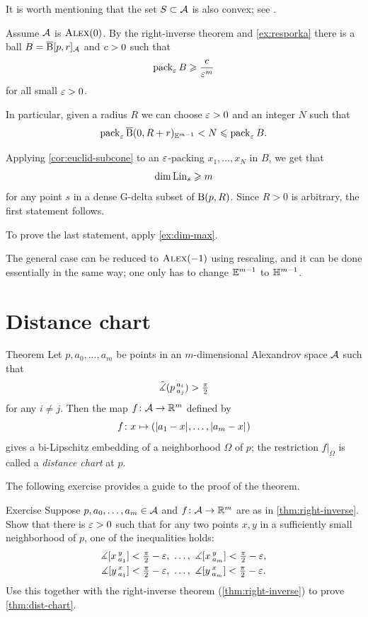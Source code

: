 It is worth mentioning that the set $S\subset\mathcal{A}$ is also convex; see \cite[1.10]{petrunin1998}.


Assume $\mathcal{A}$ is $\textup{\textsc{Alex}}(0)$.
By the right-inverse theorem and \ref{ex:resporka} there is a ball $B=\overline{\mathrm{B}}{}[p,r]_{\mathcal{A}}$ and $c>0$ such that
\[\operatorname{\rm pack}\nolimits_\varepsilon B\geqslant \frac{c}{\varepsilon^m}\]
for all small $\varepsilon>0$.

In particular, given a radius $R$ we can choose $\varepsilon>0$ and an integer $N$ such that
\[\operatorname{\rm pack}\nolimits_\varepsilon \overline{\mathrm{B}}{}(0,R+r)_{\mathbb{E}^{m-1}}< N\leqslant \operatorname{\rm pack}\nolimits_\varepsilon B.\]

Applying \ref{cor:euclid-subcone} to an $\varepsilon$-packing $x_1,\dots,x_N$ in $B$, we get that \[\dim\Lin_s\z\ge m\]
for any point $s$ in a dense G-delta subset of $\mathrm{B}{}(p,R)$.
Since $R>0$ is arbitrary, the first statement follows.

To prove the last statement, apply \ref{ex:dim-max}.

The general case can be reduced to $\textup{\textsc{Alex}}(-1)$ using rescaling,
and it can be done essentially in the same way; one only has to change $\mathbb{E}^{m-1}$ to $\mathbb{H}^{m-1}$.
\qeds

\section{Distance chart}

\begin{thm}{Theorem}\label{thm:dist-chart}
Let $p,a_0,\dots,a_m$ be points in an $m$-dimensional Alexandrov space $\mathcal{A}$ such that
\[\tilde\measuredangle(p\,{}^{a_i}_{a_j})>\tfrac\pi2\]
for any $i\ne j$.
Then the map $f\colon\mathcal{A}\to\mathbb{R}^m$ defined by
\[f\:x\mapsto (\dist{a_1}{x}{},\dots,\dist{a_m}{x}{})\]
gives a bi-Lipschitz embedding of a neighborhood $\Omega$ of $p$;
the restriction $f|_\Omega$ is called a \emph{distance chart} at $p$.
\end{thm}

The following exercise provides a guide to the proof of the theorem.

\begin{thm}[!]{Exercise}\label{ex:proof-dist-chart}
Suppose $p,a_0,\dots,a_m\in\mathcal{A}$ and $f\colon\mathcal{A}\to\mathbb{R}^m$ are as in \ref{thm:right-inverse}.
Show that there is $\varepsilon>0$ such that for any two points $x,y$ in a sufficiently small neighborhood of $p$,
one of the inequalities holds:
\begin{align*}
\measuredangle[x\,{}^{y}_{a_1}]&<\tfrac\pi2-\varepsilon,\ \dots,\ \measuredangle[x\,{}^{y}_{a_m}]<\tfrac\pi2-\varepsilon,
\\
\measuredangle[y\,{}^{x}_{a_1}]&<\tfrac\pi2-\varepsilon,\ \dots,\ \measuredangle[y\,{}^{x}_{a_m}]<\tfrac\pi2-\varepsilon.
\end{align*}
Use this together with the right-inverse theorem (\ref{thm:right-inverse}) to prove \ref{thm:dist-chart}.
\end{thm}


